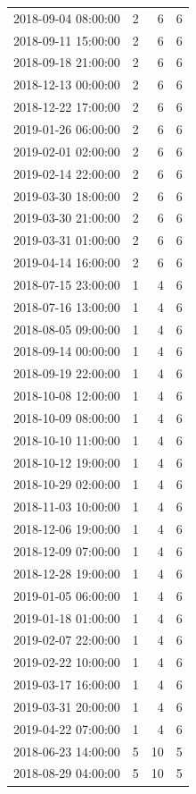 \begin{tabular}{lrrr}
2018-09-04 08:00:00 & 2 & 6 & 6 \\
2018-09-11 15:00:00 & 2 & 6 & 6 \\
2018-09-18 21:00:00 & 2 & 6 & 6 \\
2018-12-13 00:00:00 & 2 & 6 & 6 \\
2018-12-22 17:00:00 & 2 & 6 & 6 \\
2019-01-26 06:00:00 & 2 & 6 & 6 \\
2019-02-01 02:00:00 & 2 & 6 & 6 \\
2019-02-14 22:00:00 & 2 & 6 & 6 \\
2019-03-30 18:00:00 & 2 & 6 & 6 \\
2019-03-30 21:00:00 & 2 & 6 & 6 \\
2019-03-31 01:00:00 & 2 & 6 & 6 \\
2019-04-14 16:00:00 & 2 & 6 & 6 \\
2018-07-15 23:00:00 & 1 & 4 & 6 \\
2018-07-16 13:00:00 & 1 & 4 & 6 \\
2018-08-05 09:00:00 & 1 & 4 & 6 \\
2018-09-14 00:00:00 & 1 & 4 & 6 \\
2018-09-19 22:00:00 & 1 & 4 & 6 \\
2018-10-08 12:00:00 & 1 & 4 & 6 \\
2018-10-09 08:00:00 & 1 & 4 & 6 \\
2018-10-10 11:00:00 & 1 & 4 & 6 \\
2018-10-12 19:00:00 & 1 & 4 & 6 \\
2018-10-29 02:00:00 & 1 & 4 & 6 \\
2018-11-03 10:00:00 & 1 & 4 & 6 \\
2018-12-06 19:00:00 & 1 & 4 & 6 \\
2018-12-09 07:00:00 & 1 & 4 & 6 \\
2018-12-28 19:00:00 & 1 & 4 & 6 \\
2019-01-05 06:00:00 & 1 & 4 & 6 \\
2019-01-18 01:00:00 & 1 & 4 & 6 \\
2019-02-07 22:00:00 & 1 & 4 & 6 \\
2019-02-22 10:00:00 & 1 & 4 & 6 \\
2019-03-17 16:00:00 & 1 & 4 & 6 \\
2019-03-31 20:00:00 & 1 & 4 & 6 \\
2019-04-22 07:00:00 & 1 & 4 & 6 \\
2018-06-23 14:00:00 & 5 & 10 & 5 \\
2018-08-29 04:00:00 & 5 & 10 & 5 \\

\end{tabular}
